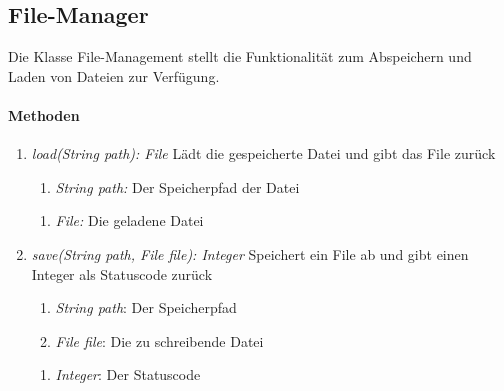 \subsection{File-Manager}
Die Klasse File-Management stellt die Funktionalität zum Abspeichern und Laden von Dateien zur Verfügung.

\paragraph{Methoden}

\begin{enumerate}[+]
	\item \textit{load(String path): File} Lädt die gespeicherte Datei und gibt das File zurück
	\begin{enumerate}[$\bullet$]
	\item \textit{String path:} Der Speicherpfad der Datei
	\end{enumerate}
	\begin{enumerate}[$\circ$]
		\item \textit{File:} Die geladene Datei
	\end{enumerate}

	\item \textit{save(String path, File file): Integer} Speichert ein File ab und gibt einen Integer als Statuscode zurück
	\begin{enumerate}[$\bullet$]
		\item \textit{String path}: Der Speicherpfad
		\item \textit{File file}: Die zu schreibende Datei
	\end{enumerate}
	\begin{enumerate}[$\circ$]
	\item \textit{Integer}: Der Statuscode
	\end{enumerate}
\end{enumerate}